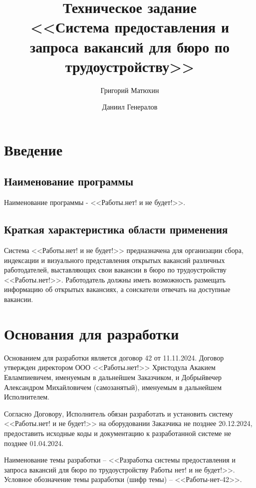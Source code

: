 \documentclass[a4page]{article}
\author{Григорий Матюхин \and Даниил Генералов}
\date{\DTMDisplaydate{2024}{2}{27}{-1}}
\title{Техническое задание\\ \Large<<Система предоставления и запроса вакансий для бюро по трудоустройству>>}
\begin{document}
\maketitle
\thispagestyle{empty}

\newpage

\tableofcontents

\newpage

\section{Введение}

\subsection{Наименование программы}

Наименование программы - <<Работы.нет! и не будет!>>.

\subsection{Краткая характеристика области применения}

Система <<Работы.нет! и не будет!>> предназначена для организации сбора, индексации и визуального представления открытых вакансий различных работодателей, выставляющих свои вакансии в бюро по трудоустройству <<Работы.нет!>>. Работодатель должны иметь возможность размещать информацию об открытых вакансиях, а соискатели отвечать на доступные вакансии.

\section{Основания для разработки}

Основанием для разработки является договор 42 от 11.11.2024. Договор утвержден директором ООО <<Работы.нет!>> Христодула Акакием Евлампиевичем, именуемым в дальнейшем Заказчиком, и Добрыйвечер Александром Михайловичем (самозанятый), именуемым в дальнейшем Исполнителем.

Согласно Договору, Исполнитель обязан разработать и установить систему <<Работы.нет! и не будет!>> на оборудовании Заказчика не позднее 20.12.2024, предоставить исходные коды и документацию к разработанной системе не позднее 01.04.2024.

Наименование темы разработки – <<Разработка системы предоставления и запроса вакансий для бюро по трудоустройству Работы нет! и не будет!>>.
Условное обозначение темы разработки (шифр темы) – <<Работы-нет-42>>.
\end{document}
